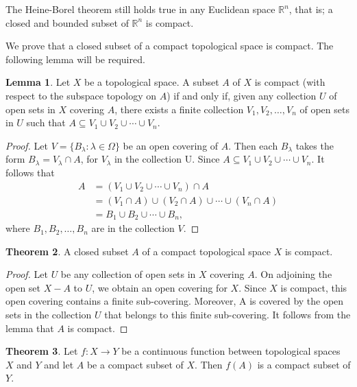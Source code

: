 \documentclass[11pt,a4paper]{article}
\theoremstyle{definition}
\newtheorem{thm}{Theorem}[subsection]
\newtheorem{lem}[thm]{Lemma}
\begin{document}
The Heine-Borel theorem still holds true in any Euclidean space $\mathbb{R}^n$, that is; a closed and bounded subset of $\mathbb{R}^n$ is compact.

We prove that a closed subset of a compact topological space is compact. The following lemma will be required.



\begin{lem}
Let $X$ be a topological space. A subset $A$ of $X$ is compact (with respect to the subspace topology on $A$) if and only if, given any collection $U$ of open sets in $X$ covering $A$, there exists a finite collection $V_1,V_2,\ldots,V_n$ of open sets in $U$ such that $A\subseteq V_1\cup V_2\cup\cdots\cup V_n$.
\end{lem}




\begin{proof}
Let $V=\{B_{\lambda}:\lambda \in \Omega\}$ be an open covering of $A$. Then each $B_{\lambda}$ takes the form $B_{\lambda}=V_{\lambda}\cap A$, for $V_{\lambda}$ in the collection U. Since $A\subseteq V_1\cup V_2\cup\cdots\cup V_n$. It follows that
\begin{align*}
A &=(V_1\cup V_2\cup\cdots\cup V_n)\cap A\\
  &=(V_1\cap A)\cup (V_2\cap A)\cup\cdots\cup(V_n\cap A)\\
  &=B_1\cup B_2\cup\cdots\cup B_n,
\end{align*} 
where $B_1,B_2,\ldots,B_n$ are in the collection $V$.
\end{proof}





\begin{thm}
A closed subset $A$ of a compact topological space $X$ is compact.
\end{thm}

\begin{proof}
Let $U$ be any collection of open sets in $X$ covering $A$. On adjoining the open set $X-A$ to $U$, we obtain an open covering for $X$. Since $X$ is compact, this open covering contains a finite sub-covering. Moreover, A is covered by the open sets in the collection $U$ that belongs to this finite sub-covering. It follows from the lemma that $A$ is compact.
\end{proof}




\begin{thm}
Let $f:X\rightarrow Y$ be a continuous function between topological spaces $X$ and $Y$ and let $A$ be a compact subset of $X$. Then $f(A)$ is a compact subset of $Y$.
\end{thm}
\end{document}
